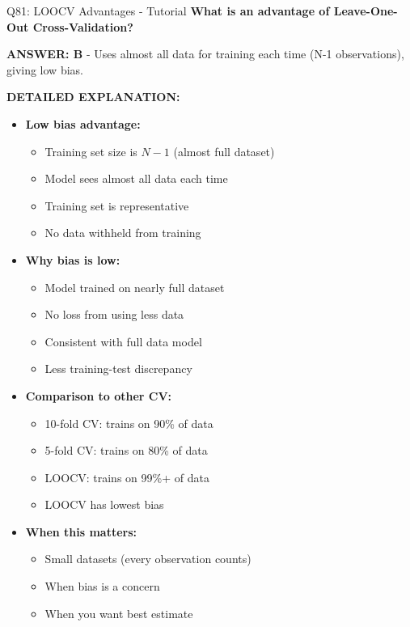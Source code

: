 \documentclass[8pt]{beamer}
\begin{document}
	\begin{frame}{Q81: LOOCV Advantages - Tutorial}
		\fontsize{6.5}{7.5}\selectfont
		\textbf{What is an advantage of Leave-One-Out Cross-Validation?}
		
		\vspace{0.05cm}
		\textcolor{myblue}{\textbf{ANSWER: B}} - Uses almost all data for training each time (N-1 observations), giving low bias.
		
		\vspace{0.05cm}
		\textbf{DETAILED EXPLANATION:}
		\begin{itemize}
			\item \textbf{Low bias advantage:}
			\begin{itemize}
				\item Training set size is $N-1$ (almost full dataset)
				\item Model sees almost all data each time
				\item Training set is representative
				\item No data withheld from training
			\end{itemize}
			\item \textbf{Why bias is low:}
			\begin{itemize}
				\item Model trained on nearly full dataset
				\item No loss from using less data
				\item Consistent with full data model
				\item Less training-test discrepancy
			\end{itemize}
			\item \textbf{Comparison to other CV:}
			\begin{itemize}
				\item 10-fold CV: trains on 90\% of data
				\item 5-fold CV: trains on 80\% of data
				\item LOOCV: trains on 99\%+ of data
				\item LOOCV has lowest bias
			\end{itemize}
			\item \textbf{When this matters:}
			\begin{itemize}
				\item Small datasets (every observation counts)
				\item When bias is a concern
				\item When you want best estimate
			\end{itemize}
		\end{itemize}
		

\end{frame}
\end{document}
